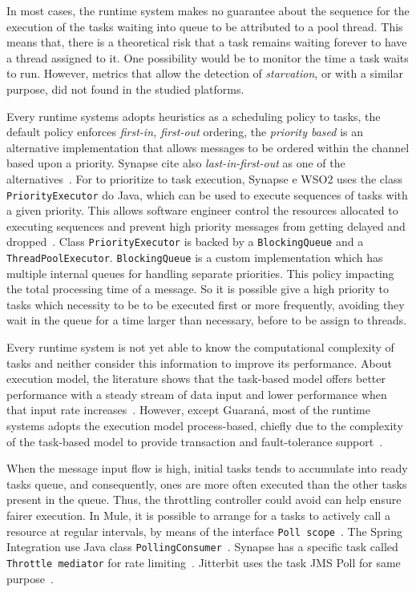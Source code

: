 In most cases, the runtime system makes no guarantee about the sequence for the execution of the tasks waiting into queue to be attributed to a pool thread. This means that, there is a theoretical risk that a task remains waiting forever to have a thread assigned to it. One possibility would be to monitor the time a task waits to run. However, metrics that allow the detection of \textit{starvation}, or with a similar purpose, did not found in the studied platforms.

Every runtime systems adopts heuristics as a scheduling policy to tasks, the default policy enforces \textit{first-in, first-out} ordering, the \textit{priority based} is an alternative implementation that allows messages to be ordered within the channel based upon a priority. Synapse cite also \textit{last-in-first-out} as one of the alternatives~\cite{Snapse1}. For to prioritize to task execution, Synapse e WSO2 uses the class \texttt{PriorityExecutor} do Java, which can be used to execute sequences of tasks with a given priority. This allows software engineer control the resources allocated to executing sequences and prevent high priority messages from getting delayed and dropped~\cite{WSO2}. Class \texttt{PriorityExecutor} is backed by a \texttt{BlockingQueue} and a \texttt{ThreadPoolExecutor}. \texttt{BlockingQueue} is a custom implementation which has multiple internal queues for handling separate priorities. This policy impacting the total processing time of a message. So it is possible give a high priority to tasks which necessity to be to be executed first or more frequently, avoiding they wait in the queue for a time larger than necessary, before to be assign to threads.

Every runtime system is not yet able to know the computational complexity of tasks and neither consider this information to improve its performance. About execution model, the literature shows that the task-based model offers better performance with a steady stream of data input and lower performance when that input rate increases~\cite{frantz2011}. However, except Guaraná, most of the runtime systems adopts the execution model process-based, chiefly due to the complexity of the task-based model to provide transaction and fault-tolerance support~\cite{frantz2012}. 

When the message input flow is high, initial tasks tends to accumulate into ready tasks queue, and consequently, ones are more often executed than the other tasks present in the queue. Thus, the throttling controller could avoid can help ensure fairer execution. In Mule, it is possible to arrange for a tasks to actively call a resource at regular intervals, by means of the interface \texttt{Poll scope}~\cite{Mule}. The Spring Integration use Java class \texttt{PollingConsumer}~\cite{Spring}. Synapse has a specific task called \texttt{Throttle mediator} for rate limiting~\cite{Snapse}. Jitterbit uses the task JMS Poll for same purpose~\cite{Jitterbit}.

